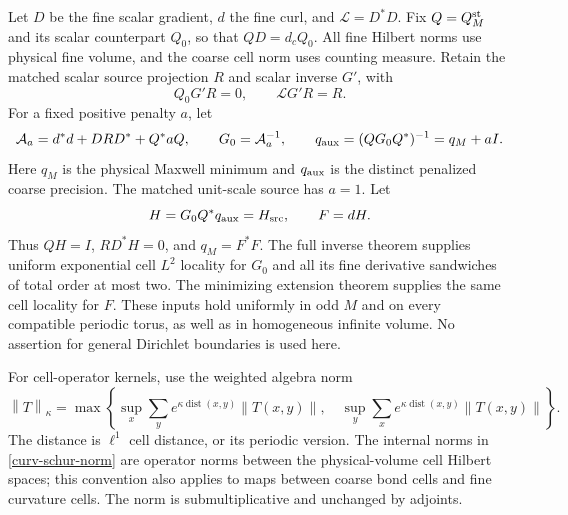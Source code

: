 \documentclass[11pt]{article}
\theoremstyle{remark}
\newcommand{\norm}[1]{\left\|#1\right\|}
\begin{document}
Let $D$ be the fine scalar gradient, $d$ the fine curl, and
$\mathcal L=D^*D$. Fix $Q=Q_M^{\rm st}$ and its scalar counterpart
$Q_0$, so that $QD=d_cQ_0$. All fine Hilbert norms use physical fine
volume, and the coarse cell norm uses counting measure. Retain the
matched scalar source projection $R$ and scalar inverse $G'$, with
\begin{equation}\label{curv-scalar-identities}
 Q_0G'R=0,\qquad \mathcal L G'R=R.
\end{equation}
For a fixed positive penalty $a$, let
\begin{equation}\label{curv-fine-data}
 \mathcal A_a=d^*d+DRD^*+Q^*aQ,\qquad G_0=\mathcal A_a^{-1},
 \qquad q_{\rm aux}=(QG_0Q^*)^{-1}=q_M+aI.
\end{equation}
Here $q_M$ is the physical Maxwell minimum and $q_{\rm aux}$ is the
distinct penalized coarse precision. The matched unit-scale source
has $a=1$. Let
\begin{equation}\label{curv-extension}
 H=G_0Q^*q_{\rm aux}=H_{\rm src},\qquad F=dH.
\end{equation}
Thus $QH=I$, $RD^*H=0$, and $q_M=F^*F$.
The full inverse theorem supplies uniform exponential cell $L^2$
locality for $G_0$ and all its fine derivative sandwiches of total
order at most two. The minimizing extension theorem supplies the same
cell locality for $F$. These inputs hold uniformly in odd $M$ and on
every compatible periodic torus, as well as in homogeneous infinite
volume. No assertion for general Dirichlet boundaries is used here.

For cell-operator kernels, use the weighted algebra norm
\begin{equation}\label{curv-schur-norm}
 \norm{T}_\kappa=
 \max\left\{\sup_x\sum_y e^{\kappa\operatorname{dist}(x,y)}
                  \norm{T(x,y)},\quad
             \sup_y\sum_x e^{\kappa\operatorname{dist}(x,y)}
                  \norm{T(x,y)}\right\}.
\end{equation}
The distance is $\ell^1$ cell distance, or its periodic version.
The internal norms in \eqref{curv-schur-norm} are operator norms
between the physical-volume cell Hilbert spaces; this convention
also applies to maps between coarse bond cells and fine curvature
cells. The norm is submultiplicative and unchanged by adjoints.
\end{document}

